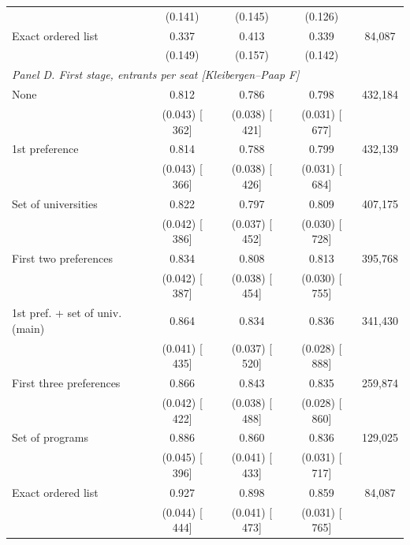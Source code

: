 \begin{tabular}{l*{4}{c}}
 & (0.141) & (0.145) & (0.126) & \\
Exact ordered list &  0.337\sym{**} &  0.413\sym{***} &  0.339\sym{**} &    84,087 \\
 & (0.149) & (0.157) & (0.142) & \\
\midrule
\multicolumn{5}{l}{\textit{Panel D. First stage, entrants per seat [Kleibergen--Paap F]}} \\
None &  0.812\sym{***} &  0.786\sym{***} &  0.798\sym{***} &   432,184 \\
 & (0.043) [ 362] & (0.038) [ 421] & (0.031) [ 677] & \\
1st preference &  0.814\sym{***} &  0.788\sym{***} &  0.799\sym{***} &   432,139 \\
 & (0.043) [ 366] & (0.038) [ 426] & (0.031) [ 684] & \\
Set of universities &  0.822\sym{***} &  0.797\sym{***} &  0.809\sym{***} &   407,175 \\
 & (0.042) [ 386] & (0.037) [ 452] & (0.030) [ 728] & \\
First two preferences &  0.834\sym{***} &  0.808\sym{***} &  0.813\sym{***} &   395,768 \\
 & (0.042) [ 387] & (0.038) [ 454] & (0.030) [ 755] & \\
1st pref. + set of univ. (main) &  0.864\sym{***} &  0.834\sym{***} &  0.836\sym{***} &   341,430 \\
 & (0.041) [ 435] & (0.037) [ 520] & (0.028) [ 888] & \\
First three preferences &  0.866\sym{***} &  0.843\sym{***} &  0.835\sym{***} &   259,874 \\
 & (0.042) [ 422] & (0.038) [ 488] & (0.028) [ 860] & \\
Set of programs &  0.886\sym{***} &  0.860\sym{***} &  0.836\sym{***} &   129,025 \\
 & (0.045) [ 396] & (0.041) [ 433] & (0.031) [ 717] & \\
Exact ordered list &  0.927\sym{***} &  0.898\sym{***} &  0.859\sym{***} &    84,087 \\
 & (0.044) [ 444] & (0.041) [ 473] & (0.031) [ 765] & \\
\bottomrule
\end{tabular}
